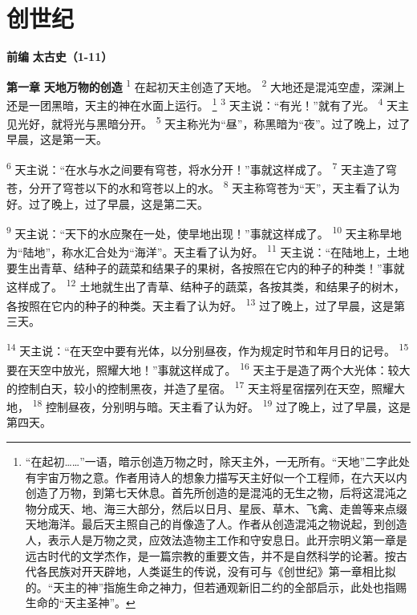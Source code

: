 \chapter{创世纪}

\begin{center}
	\textbf{前编 }
	\textbf{太古史（1-11）}
\end{center}

\textbf{第一章 }
\textbf{天地万物的创造 }
\textsuperscript{1}
在起初天主创造了天地。
\textsuperscript{2}  
大地还是混沌空虚，深渊上还是一团黑暗，天主的神在水面上运行。
\renewcommand\thefootnote{\ding{\numexpr171+\value{footnote}}}
\footnote{“在起初……”一语，暗示创造万物之时，除天主外，一无所有。“天地”二字此处有宇宙万物之意。作者用诗人的想象力描写天主好似一个工程师，在六天以内创造了万物，到第七天休息。首先所创造的是混沌的无生之物，后将这混沌之物分成天、地、海三大部分，然后以日月、星辰、草木、飞禽、走兽等来点缀天地海洋。最后天主照自己的肖像造了人。作者从创造混沌之物说起，到创造人，表示人是万物之灵，应效法造物主工作和守安息日。此开宗明义第一章是远古时代的文学杰作，是一篇宗教的重要文告，并不是自然科学的论著。按古代各民族对开天辟地，人类诞生的传说，没有可与《创世纪》第一章相比拟的。“天主的神”指施生命之神力，但若通观新旧二约的全部启示，此处也指赐生命的“天主圣神”。}
\textsuperscript{3}
天主说：“有光！”就有了光。
\textsuperscript{4}
天主见光好，就将光与黑暗分开。
\textsuperscript{5}
天主称光为“昼”，称黑暗为“夜”。过了晚上，过了早晨，这是第一天。

\textsuperscript{6}
天主说：“在水与水之间要有穹苍，将水分开！”事就这样成了。
\textsuperscript{7}
天主造了穹苍，分开了穹苍以下的水和穹苍以上的水。
\textsuperscript{8}
天主称穹苍为“天”，天主看了认为好。过了晚上，过了早晨，这是第二天。

\textsuperscript{9}
天主说：“天下的水应聚在一处，使旱地出现！”事就这样成了。
\textsuperscript{10}
天主称旱地为“陆地”，称水汇合处为“海洋”。天主看了认为好。
\textsuperscript{11}
天主说：“在陆地上，土地要生出青草、结种子的蔬菜和结果子的果树，各按照在它内的种子的种类！”事就这样成了。
\textsuperscript{12}
土地就生出了青草、结种子的蔬菜，各按其类，和结果子的树木，各按照在它内的种子的种类。天主看了认为好。
\textsuperscript{13}
过了晚上，过了早晨，这是第三天。

\textsuperscript{14}
天主说：“在天空中要有光体，以分别昼夜，作为规定时节和年月日的记号。
\textsuperscript{15}
要在天空中放光，照耀大地！”事就这样成了。
\textsuperscript{16}
天主于是造了两个大光体：较大的控制白天，较小的控制黑夜，并造了星宿。
\textsuperscript{17}
天主将星宿摆列在天空，照耀大地，
\textsuperscript{18}
控制昼夜，分别明与暗。天主看了认为好。
\textsuperscript{19}
过了晚上，过了早晨，这是第四天。


